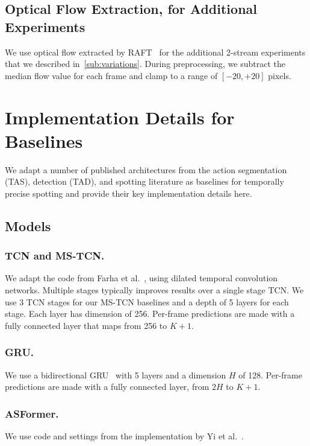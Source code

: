 \documentclass[runningheads]{llncs}
\newcommand{\notation}[1]{\ensuremath{#1}\xspace}
\newcommand{\NumClasses}{\notation{K}}
\begin{document}
\subsection{Optical Flow Extraction, for Additional Experiments}

We use optical flow extracted by RAFT~\cite{raft} for the additional 2-stream experiments that we described in~\autoref{sub:variations}.
During preprocessing, we subtract the median flow value for each frame and clamp to a range of $[-20, +20]$ pixels.

\section{Implementation Details for Baselines}
\label{sec:supp_baseline_impl}

We adapt a number of published architectures from the action segmentation (TAS), detection (TAD), and spotting literature as baselines for temporally precise spotting and provide their key implementation details here.

\subsection{Models}
\label{sub:supp_baseline_models}

\subsubsection*{TCN and MS-TCN.}
We adapt the code from Farha et al.~\cite{mstcn}, using dilated temporal convolution networks.
Multiple stages typically improves results over a single stage TCN.
We use 3 TCN stages for our MS-TCN baselines and a depth of 5 layers for each stage.
Each layer has dimension of 256. Per-frame predictions are made with a fully connected layer that maps from 256 to $\NumClasses + 1$.

\subsubsection*{GRU.}
We use a bidirectional GRU~\cite{gatedrnn} with 5 layers and a dimension $H$ of 128.
Per-frame predictions are made with a fully connected layer, from $2H$ to $\NumClasses + 1$.

\subsubsection*{ASFormer.}
We use code and settings from the implementation by Yi et al.~\cite{asformer}.
\end{document}
